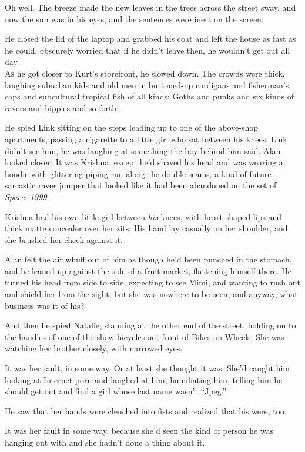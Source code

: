 \documentclass{article}
\begin{document}
Oh well.  The breeze made the new leaves in the trees across the
street sway, and now the sun was in his eyes, and the sentences were
inert on the screen.

He closed the lid of the laptop and grabbed his coat and left the
house as fast as he could, obscurely worried that if he didn't leave
then, he wouldn't get out all day.
\\
\lettrine[lines=3, lhang=.5, nindent=0pt, findent=2pt]{A}{s} he got closer to Kurt's storefront, he slowed down.  The crowds
were thick, laughing suburban kids and old men in buttoned-up
cardigans and fisherman's caps and subcultural tropical fish of all
kinds:  Goths and punks and six kinds of ravers and hippies and so
forth.

He spied Link sitting on the steps leading up to one of the above-shop
apartments, passing a cigarette to a little girl who sat between his
knees.  Link didn't see him, he was laughing at something the boy
behind him said.  Alan looked closer.  It was Krishna, except he'd
shaved his head and was wearing a hoodie with glittering piping run
along the double seams, a kind of future-sarcastic raver jumper that
looked like it had been abandoned on the set of \textit{Space:  1999}.

Krishna had his own little girl between \textit{his} knees, with
heart-shaped lips and thick matte concealer over her zits.  His hand
lay casually on her shoulder, and she brushed her cheek against it.

Alan felt the air whuff out of him as though he'd been punched in the
stomach, and he leaned up against the side of a fruit market,
flattening himself there.  He turned his head from side to side,
expecting to see Mimi, and wanting to rush out and shield her from the
sight, but she was nowhere to be seen, and anyway, what business was
it of his?

And then he spied Natalie, standing at the other end of the street,
holding on to the handles of one of the show bicycles out front of
Bikes on Wheels.  She was watching her brother closely, with narrowed
eyes.

It was her fault, in some way.  Or at least she thought it was.  She'd
caught him looking at Internet porn and laughed at him, humiliating
him, telling him he should get out and find a girl whose last name
wasn't ``Jpeg.''

He saw that her hands were clenched into fists and realized that his
were, too.

It was her fault in some way, because she'd seen the kind of person he
was hanging out with and she hadn't done a thing about it.
\end{document}
